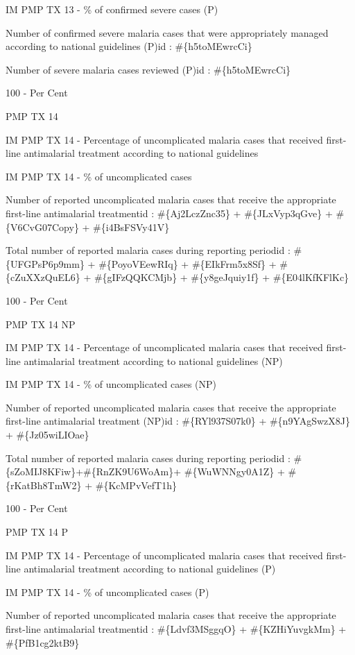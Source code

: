 \documentclass[]{book}
\begin{document}
IM PMP TX 13 - \% of confirmed severe cases (P)

Number of confirmed severe malaria cases that were appropriately managed according to national guidelines (P)id : \#\{h5toMEwrcCi\}

Number of severe malaria cases reviewed (P)id : \#\{h5toMEwrcCi\}

100 - Per Cent

PMP TX 14

IM PMP TX 14 - Percentage of uncomplicated malaria cases that received first-line antimalarial treatment according to national guidelines

IM PMP TX 14 - \% of uncomplicated cases

Number of reported uncomplicated malaria cases that receive the appropriate first-line antimalarial treatmentid : \#\{Aj2LczZnc35\} + \#\{JLxVyp3qGve\} + \#\{V6CvG07Copy\} + \#\{i4BsFSVy41V\}

Total number of reported malaria cases during reporting periodid : \#\{UFGPsP6p9mm\} + \#\{PoyoVEewRIq\} + \#\{EIkFrm5x8Sf\} + \#\{cZuXXzQuEL6\} + \#\{gIFzQQKCMjb\} + \#\{y8geJquiy1f\} + \#\{E04lKfKFlKc\}

100 - Per Cent

PMP TX 14 NP

IM PMP TX 14 - Percentage of uncomplicated malaria cases that received first-line antimalarial treatment according to national guidelines (NP)

IM PMP TX 14 - \% of uncomplicated cases (NP)

Number of reported uncomplicated malaria cases that receive the appropriate first-line antimalarial treatment (NP)id : \#\{RYl937S07k0\} + \#\{n9YAgSwzX8J\} + \#\{Jz05wiLIOae\}

Total number of reported malaria cases during reporting periodid : \#\{sZoMIJ8KFiw\}+\#\{RnZK9U6WoAm\}+ \#\{WuWNNgy0A1Z\} + \#\{rKatBh8TmW2\} + \#\{KcMPvVefT1h\}

100 - Per Cent

PMP TX 14 P

IM PMP TX 14 - Percentage of uncomplicated malaria cases that received first-line antimalarial treatment according to national guidelines (P)

IM PMP TX 14 - \% of uncomplicated cases (P)

Number of reported uncomplicated malaria cases that receive the appropriate first-line antimalarial treatmentid : \#\{Ldvf3MSggqO\} + \#\{KZHiYuvgkMm\} + \#\{PfB1cg2ktB9\}
\end{document}
